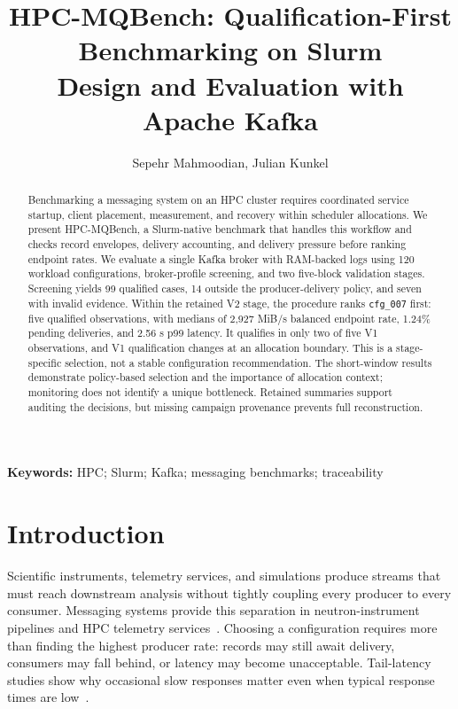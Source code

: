 \documentclass[10pt]{article}
\title{\textbf{HPC-MQBench: Qualification-First Benchmarking on Slurm}\\[0.4em]\large Design and Evaluation with Apache Kafka}
\author{Sepehr Mahmoodian, Julian Kunkel}
\date{}
\newcommand{\system}{HPC-MQBench}
\begin{document}
\maketitle

\begin{abstract}
Benchmarking a messaging system on an HPC cluster requires coordinated service
startup, client placement, measurement, and recovery within scheduler allocations.
We present \system{}, a Slurm-native benchmark that handles this workflow and
checks record envelopes, delivery accounting, and delivery pressure before ranking endpoint rates.
We evaluate a single Kafka broker with RAM-backed logs using 120 workload
configurations, broker-profile screening, and two five-block validation stages.
Screening yields 99 qualified cases, 14 outside the producer-delivery policy,
and seven with invalid evidence.  Within the retained V2 stage, the procedure
ranks \texttt{cfg\_007} first: five qualified observations, with medians of
2,927 MiB/s balanced endpoint rate, 1.24\% pending deliveries, and 2.56 s p99 latency.
It qualifies in only two of five V1 observations, and V1 qualification changes
at an allocation boundary.  This is a stage-specific selection, not a stable
configuration recommendation.  The short-window results demonstrate policy-based
selection and the importance of allocation context; monitoring does not identify
a unique bottleneck.  Retained summaries support auditing the decisions, but
missing campaign provenance prevents full reconstruction.
\end{abstract}

\noindent\textbf{Keywords:} HPC; Slurm; Kafka; messaging benchmarks; traceability

\section{Introduction}
\label{sec:introduction}

Scientific instruments, telemetry services, and simulations produce streams that
must reach downstream analysis without tightly coupling every producer to every
consumer.  Messaging systems provide this separation in neutron-instrument
pipelines and HPC telemetry services~\cite{mukai2018ess,adamson2023stream}.
Choosing a configuration requires more than finding the highest producer rate:
records may still await delivery, consumers may fall behind, or latency may become
unacceptable.  Tail-latency studies show why occasional slow responses matter
even when typical response times are low~\cite{dean2013tail}.
\end{document}
